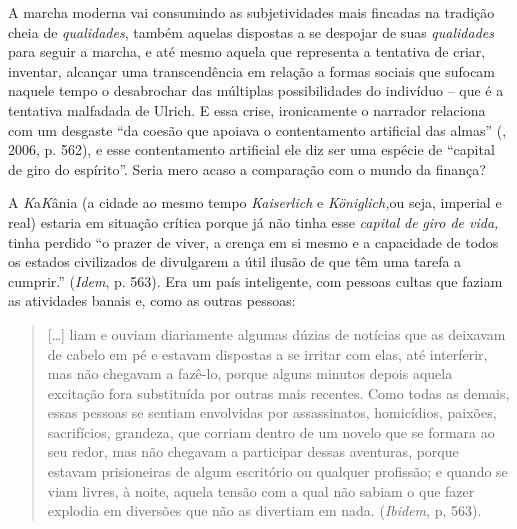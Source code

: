 {A marcha moderna vai consumindo as subjetividades mais fincadas na
tradição cheia de \emph{qualidades}, também aquelas dispostas a se
despojar de suas \emph{qualidades} para seguir a marcha, e até mesmo
aquela que representa a tentativa de criar, inventar, alcançar uma
transcendência em relação a formas sociais que sufocam naquele tempo o
desabrochar das múltiplas possibilidades do indivíduo -- que é a
tentativa malfadada de Ulrich. E essa crise, ironicamente o narrador
relaciona com um desgaste ``da coesão que apoiava o contentamento
artificial das almas'' (, 2006, p. 562), e esse contentamento
artificial ele diz ser uma espécie de ``capital de giro do espírito''.
Seria mero acaso a comparação com o mundo da finança?

A \emph{K}a\emph{K}ânia (a cidade ao mesmo tempo \emph{Kaiserlich} e
\emph{Königlich,}ou seja, imperial e real) estaria em situação crítica
porque já não tinha esse \emph{capital} \emph{de} \emph{giro de vida,}
tinha perdido ``o prazer de viver, a crença em si mesmo e a capacidade
de todos os estados civilizados de divulgarem a útil ilusão de que têm
uma tarefa a cumprir.'' (\emph{Idem}, p. 563). Era um país
inteligente, com pessoas cultas que faziam as atividades banais e, como
as outras pessoas:

\begin{quote}
[\ldots{}] liam e ouviam diariamente algumas dúzias de notícias que as
deixavam de cabelo em pé e estavam dispostas a se irritar com elas, até
interferir, mas não chegavam a fazê-lo, porque alguns minutos depois
aquela excitação fora substituída por outras mais recentes. Como todas
as demais, essas pessoas se sentiam envolvidas por assassinatos,
homicídios, paixões, sacrifícios, grandeza, que corriam dentro de um
novelo que se formara ao seu redor, mas não chegavam a participar dessas
aventuras, porque estavam prisioneiras de algum escritório ou qualquer
profissão; e quando se viam livres, à noite, aquela tensão com a qual
não sabiam o que fazer explodia em diversões que não as divertiam em
nada. (\emph{Ibidem}, p, 563).
\end{quote}

}

